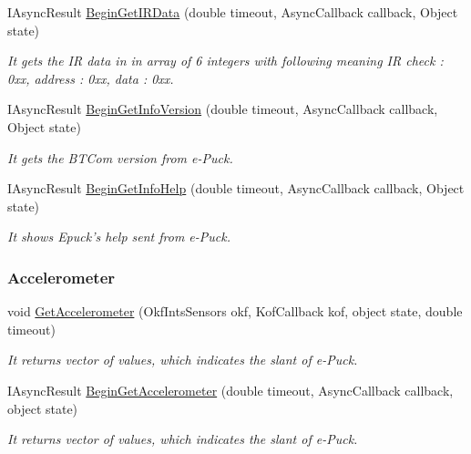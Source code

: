\begin{DoxyCompactItemize}
  \item IAsyncResult \hyperlink{class_elib_1_1_epuck_a58eb06f216af8ff7a7203f0f91b010e7}{BeginGetIRData} (double timeout, AsyncCallback callback, Object state)
  \begin{DoxyCompactList}\small\item\em It gets the IR data in in array of 6 integers with following meaning IR check : 0xx, address : 0xx, data : 0xx. \item\end{DoxyCompactList}

  \item   IAsyncResult \hyperlink{class_elib_1_1_epuck_a0146f79525c327c913b540186e354916}{BeginGetInfoVersion} (double timeout, AsyncCallback callback, Object state)
  \begin{DoxyCompactList}\small\item\em It gets the BTCom version from e-\/Puck. \item\end{DoxyCompactList}

  \item   IAsyncResult \hyperlink{class_elib_1_1_epuck_a0e599fe0065ac2c3ae2ac96aede901c6}{BeginGetInfoHelp} (double timeout, AsyncCallback callback, Object state)
  \begin{DoxyCompactList}\small\item\em It shows Epuck's help sent from e-\/Puck. \item\end{DoxyCompactList}

  \end{DoxyCompactItemize}

  
 \subsubsection*{Accelerometer} %
 \label{ssub:Accelerometer}
  \begin{DoxyCompactItemize}

  \item  void \hyperlink{class_elib_1_1_epuck_a87e5d0c07a8d2cc6909dabbc1a79ca1d}{GetAccelerometer} (OkfIntsSensors okf, KofCallback kof, object state, double timeout)
  \begin{DoxyCompactList}\small\item\em It returns vector of values, which indicates the slant of e-\/Puck. \item\end{DoxyCompactList}
  
  \item  IAsyncResult \hyperlink{class_elib_1_1_epuck_a6d09043fbbed47c089ad6f7cffa05e8c}{BeginGetAccelerometer} (double timeout, AsyncCallback callback, object state)
  \begin{DoxyCompactList}\small\item\em It returns vector of values, which indicates the slant of e-\/Puck. \item\end{DoxyCompactList}

  \end{DoxyCompactItemize}


